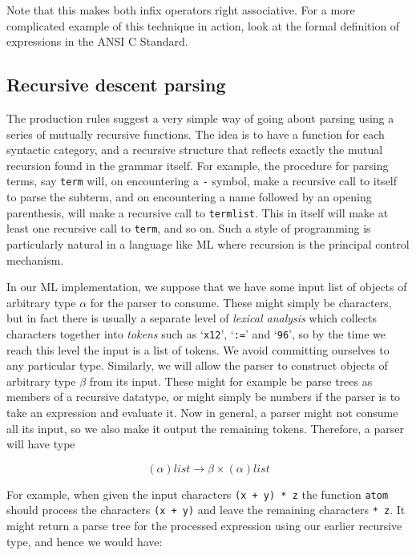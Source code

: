 Note that this makes both infix operators right associative. For a more
complicated example of this technique in action, look at the formal definition
of expressions in the ANSI C Standard.

\subsection{Recursive descent parsing}

The production rules suggest a very simple way of going about parsing using a
series of mutually recursive functions. The idea is to have a function for each
syntactic category, and a recursive structure that reflects exactly the mutual
recursion found in the grammar itself. For example, the procedure for parsing
terms, say {\verb!term!} will, on encountering a {\verb!-!} symbol, make a
recursive call to itself to parse the subterm, and on encountering a name
followed by an opening parenthesis, will make a recursive call to
{\verb!termlist!}. This in itself will make at least one recursive call to
{\verb!term!}, and so on. Such a style of programming is particularly natural
in a language like ML where recursion is the principal control mechanism.

In our ML implementation, we suppose that we have some input list of objects of
arbitrary type $\alpha$ for the parser to consume. These might simply be
characters, but in fact there is usually a separate level of {\em lexical
analysis} which collects characters together into {\em tokens} such as
`{\verb!x12!}', `{\verb!:=!}' and `{\verb!96!}', so by the time we reach this
level the input is a list of tokens. We avoid committing ourselves to any
particular type. Similarly, we will allow the parser to construct objects of
arbitrary type $\beta$ from its input. These might for example be parse trees
as members of a recursive datatype, or might simply be numbers if the parser is
to take an expression and evaluate it. Now in general, a parser might not
consume all its input, so we also make it output the remaining tokens.
Therefore, a parser will have type

$$ (\alpha)list \to \beta \times (\alpha)list $$

For example, when given the input characters {\verb!(x + y) * z!} the
function {\verb!atom!} should process the characters {\verb!(x + y)!} and leave
the remaining characters {\verb!* z!}. It might return a parse tree for the
processed expression using our earlier recursive type, and hence we would have:

